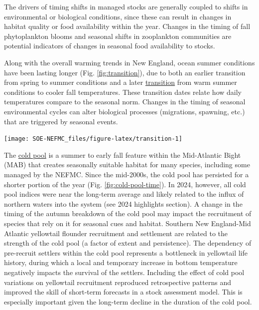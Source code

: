 \documentclass[
  10pt,
]{article}
\let\origfigure\figure
\let\endorigfigure\endfigure
\renewenvironment{figure}[1][2] {
    \expandafter\origfigure\expandafter[H]
} {
    \endorigfigure
}
\begin{document}
The drivers of timing shifts in managed stocks are generally coupled to shifts in environmental or biological conditions, since these can result in changes in habitat quality or food availability within the year. Changes in the timing of fall phytoplankton blooms and seasonal shifts in zooplankton communities are potential indicators of changes in seasonal food availability to stocks.

Along with the overall warming trends in New England, ocean summer conditions have been lasting longer (Fig. \ref{fig:transition}), due to both an earlier transition from spring to summer conditions and a later \href{https://noaa-edab.github.io/catalog/trans_dates.html}{transition} from warm summer conditions to cooler fall temperatures. These transition dates relate how daily temperatures compare to the seasonal norm. Changes in the timing of seasonal environmental cycles can alter biological processes (migrations, spawning, etc.) that are triggered by seasonal events.

\begin{figure}

{\centering \texttt{[image: SOE-NEFMC\_files/figure-latex/transition-1]} 

}

\caption{Ocean summer length: the annual total number of days between the spring thermal transition date and the fall thermal transition date.}\label{fig:transition}
\end{figure}

The \href{https://noaa-edab.github.io/catalog/cold_pool.html}{cold pool} is a summer to early fall feature within the Mid-Atlantic Bight (MAB) that creates seasonally suitable habitat for many species, including some managed by the NEFMC. Since the mid-2000s, the cold pool has persisted for a shorter portion of the year (Fig. \ref{fig:cold-pool-time}). In 2024, however, all cold pool indices were near the long-term average and likely related to the influx of northern waters into the system (see 2024 highlights section). A change in the timing of the autumn breakdown of the cold pool may impact the recruitment of species that rely on it for seasonal cues and habitat. Southern New England-Mid Atlantic yellowtail flounder recruitment and settlement are related to the strength of the cold pool (a factor of extent and persistence). The dependency of pre-recruit settlers within the cold pool represents a bottleneck in yellowtail life history, during which a local and temporary increase in bottom temperature negatively impacts the survival of the settlers. Including the effect of cold pool variations on yellowtail recruitment reproduced retrospective patterns and improved the skill of short-term forecasts in a stock assessment model. This is especially important given the long-term decline in the duration of the cold pool.
\end{document}
